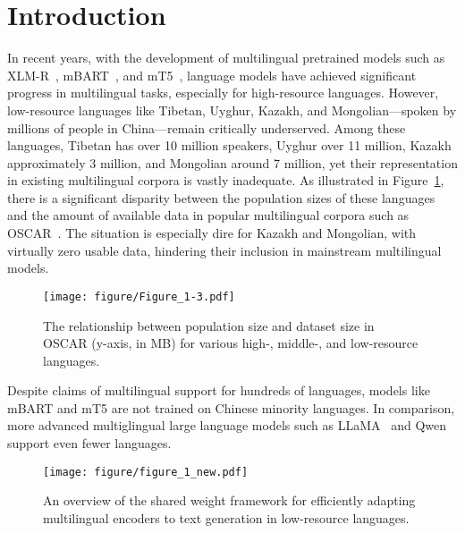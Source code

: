 \section{Introduction}\label{sec:intro}

In recent years, with the development of multilingual pretrained models such as XLM-R~\citep{xlm-r}, mBART~\citep{mbart}, and mT5~\citep{mt5}, language models have achieved significant progress in multilingual tasks, especially for high-resource languages. However, low-resource languages like Tibetan, Uyghur, Kazakh, and Mongolian—spoken by millions of people in China—remain critically underserved. Among these languages, Tibetan has over 10 million speakers, Uyghur over 11 million, Kazakh approximately 3 million, and Mongolian around 7 million, yet their representation in existing multilingual corpora is vastly inadequate. As illustrated in Figure~\ref{fig:1_plot}, there is a significant disparity between the population sizes of these languages and the amount of available data in popular multilingual corpora such as OSCAR~\citep{OSCAR}. The situation is especially dire for Kazakh and Mongolian, with virtually zero usable data, hindering their inclusion in mainstream multilingual models.
\begin{figure}
    \centering
    \texttt{[image: figure/Figure\_1-3.pdf]}
    \caption{The relationship between population size and dataset size in OSCAR (y-axis, in MB) for various high-, middle-, and low-resource languages.}
    \label{fig:1_plot}
\end{figure}


Despite claims of multilingual support for hundreds of languages, models like mBART and mT5 are not trained on Chinese minority languages. In comparison, more advanced multiglingual large language models such as LLaMA~\citep{llama} and Qwen~\citep{qwen2} support even fewer languages. 

\begin{figure*}
    \centering
    \texttt{[image: figure/figure\_1\_new.pdf]} %
    \caption{An overview of the shared weight framework for efficiently adapting multilingual encoders to text generation in low-resource languages.}
    \label{fig:overview-model}
\end{figure*}

